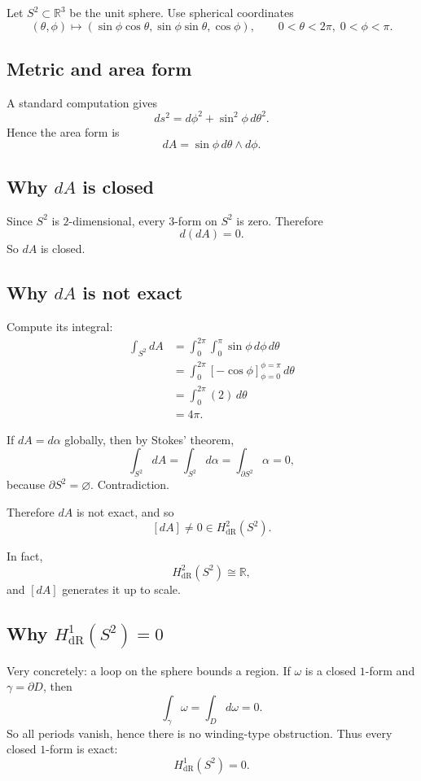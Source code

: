 \documentclass[11pt]{article}
\begin{document}
	Let \(S^2\subset \mathbb{R}^3\) be the unit sphere. Use spherical coordinates
	\[
	(\theta,\phi)\longmapsto
	(\sin\phi\cos\theta,\sin\phi\sin\theta,\cos\phi),
	\qquad
	0<\theta<2\pi,\;0<\phi<\pi.
	\]
	
	\subsection*{Metric and area form}
	
	A standard computation gives
	\[
	ds^2=d\phi^2+\sin^2\phi\,d\theta^2.
	\]
	Hence the area form is
	\[
	dA=\sin\phi\,d\theta\wedge d\phi.
	\]
	
	\subsection*{Why \(dA\) is closed}
	
	Since \(S^2\) is \(2\)-dimensional, every \(3\)-form on \(S^2\) is zero. Therefore
	\[
	d(dA)=0.
	\]
	So \(dA\) is closed.
	
	\subsection*{Why \(dA\) is not exact}
	
	Compute its integral:
	\begin{align*}
		\int_{S^2} dA
		&=
		\int_0^{2\pi}\int_0^\pi \sin\phi\,d\phi\,d\theta\\
		&=
		\int_0^{2\pi}\left[-\cos\phi\right]_{\phi=0}^{\phi=\pi}\,d\theta\\
		&=
		\int_0^{2\pi}(2)\,d\theta\\
		&=
		4\pi.
	\end{align*}
	
	If \(dA=d\alpha\) globally, then by Stokes' theorem,
	\[
	\int_{S^2} dA
	=
	\int_{S^2} d\alpha
	=
	\int_{\partial S^2}\alpha
	=
	0,
	\]
	because \(\partial S^2=\varnothing\). Contradiction.
	
	Therefore \(dA\) is not exact, and so
	\[
	[dA]\neq 0\in H^2_{\mathrm{dR}}(S^2).
	\]
	
	In fact,
	\[
	H^2_{\mathrm{dR}}(S^2)\cong \mathbb{R},
	\]
	and \([dA]\) generates it up to scale.
	
	\subsection*{Why \(H^1_{\mathrm{dR}}(S^2)=0\)}
	
	Very concretely: a loop on the sphere bounds a region. If \(\omega\) is a closed \(1\)-form and \(\gamma=\partial D\), then
	\[
	\int_\gamma \omega
	=
	\int_D d\omega
	=
	0.
	\]
	So all periods vanish, hence there is no winding-type obstruction. Thus every closed \(1\)-form is exact:
	\[
	H^1_{\mathrm{dR}}(S^2)=0.
	\]
	
\end{document}
